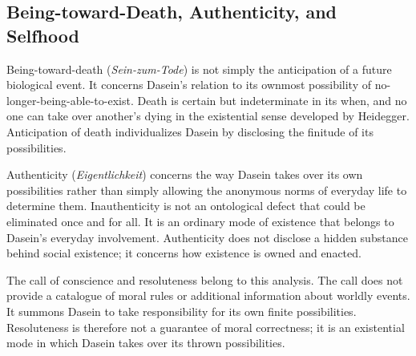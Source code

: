 



\subsection{Being-toward-Death, Authenticity, and Selfhood}
\label{subsec:ch08-heidegger-authenticity}

\label{para:VS.B01.P01.C08.S11.SS09.P001}

Being-toward-death (\textit{Sein-zum-Tode}) is not simply
the anticipation of a future biological event. It
concerns Dasein's relation to its ownmost possibility
of no-longer-being-able-to-exist. Death is certain
but indeterminate in its when, and no one can take
over another's dying in the existential sense
developed by Heidegger. Anticipation of death
individualizes Dasein by disclosing the finitude
of its possibilities.
\cite[§§46--53]{HeideggerBeingTime}

\label{para:VS.B01.P01.C08.S11.SS09.P002}

Authenticity (\textit{Eigentlichkeit}) concerns the
way Dasein takes over its own possibilities rather
than simply allowing the anonymous norms of everyday
life to determine them. Inauthenticity is not an
ontological defect that could be eliminated once
and for all. It is an ordinary mode of existence
that belongs to Dasein's everyday involvement.
Authenticity does not disclose a hidden substance
behind social existence; it concerns how existence
is owned and enacted.
\cite[§§54--60]{HeideggerBeingTime}

\label{para:VS.B01.P01.C08.S11.SS09.P003}

The call of conscience and resoluteness belong to
this analysis. The call does not provide a catalogue
of moral rules or additional information about
worldly events. It summons Dasein to take responsibility
for its own finite possibilities. Resoluteness is
therefore not a guarantee of moral correctness;
it is an existential mode in which Dasein takes
over its thrown possibilities.
\cite[§§54--60]{HeideggerBeingTime}

